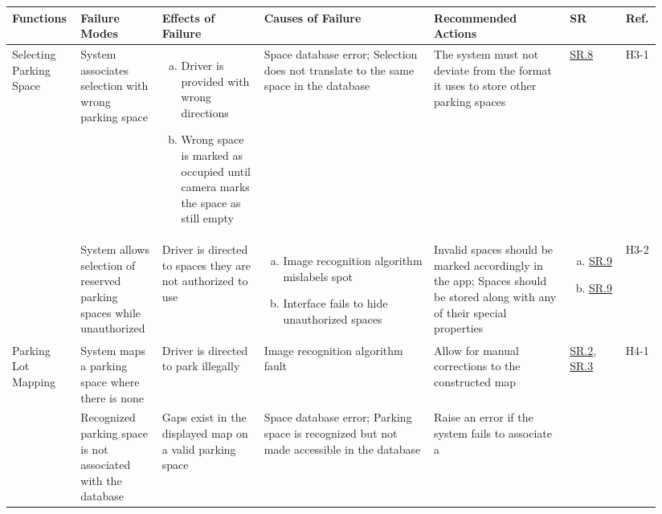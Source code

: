 \documentclass[12pt,letterpaper]{article}
\begin{document}
\begin{landscape}
\begin{table}[hp]
\begin{tabular}{|p{0.09\linewidth}|p{0.12\linewidth}|p{0.15\linewidth}|p{0.25\linewidth}|p{0.2\linewidth}|p{0.075\linewidth}|p{0.05\linewidth}|}
\hline
Functions & Failure Modes & Effects of Failure & Causes of Failure & Recommended
Actions & SR & Ref.\\
\hline
Selecting Parking Space & System associates selection with wrong parking space &
\begin{enumerate}[a., leftmargin=0.5cm, noitemsep, nolistsep] \item Driver is
provided with wrong directions \item Wrong space is marked as occupied until
camera marks the space as still empty \end{enumerate} & Space database error;
Selection does not translate to the same space in the database & The system must
not deviate from the format it uses to store other parking spaces &
\hyperref[isr8]{SR.8} & H3-1\\\cline{2-7} & System allows selection of reserved
parking spaces while unauthorized & Driver is directed to spaces they are not
authorized to use & \begin{enumerate}[a., leftmargin=0.5cm, noitemsep,
nolistsep] \item Image recognition algorithm mislabels spot \item Interface
fails to hide unauthorized spaces \end{enumerate} & Invalid spaces should be
marked accordingly in the app; Spaces should be stored along with any of their
special properties & \begin{enumerate}[a., leftmargin=0.5cm, noitemsep,
nolistsep]\item \hyperref[isr9]{SR.9} \item \hyperref[isr9]{SR.9}
\end{enumerate}& H3-2\\
\hline
Parking Lot Mapping & System maps a parking space where there is none & Driver
is directed to park illegally & Image recognition algorithm fault & Allow for
manual corrections to the constructed map & \hyperref[asr2]{SR.2},
\hyperref[asr3]{SR.3} & H4-1\\\cline{2-7} & Recognized parking space is not
associated with the database & Gaps exist in the displayed map on a valid
parking space & Space database error; Parking space is recognized but not made
accessible in the database & Raise an error if the system fails to associate a

\end{tabular}
\end{table}
\end{landscape}
\end{document}
